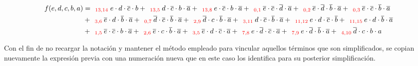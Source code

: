 \begin{equation*}
\begin{align*}
f(e,d,c,b,a) & = _{\ \ \color{red} 13,14} {e \cdot d \cdot \overline{c} \cdot b} 
+ _{\ \ \color{red} 13,5}  {d \cdot \overline{c} \cdot b \cdot \overline{a}}
+ _{\ \ \color{red} 13,8}  {e \cdot \overline{c} \cdot b \cdot \overline{a}}
+ _{\ \ \color{red} 0,1}  {\overline{e} \cdot \overline{c} \cdot \overline{d} \cdot \overline{a}}
+ _{\ \ \color{red} 0,2}  {\overline{e} \cdot \overline{d} \cdot \overline{b} \cdot \overline{a}}
+ _{\ \ \color{red} 0,3}  {\overline{e} \cdot \overline{c} \cdot \overline{b} \cdot \overline{a}} \\
& + _{\ \ \color{red} 3,6}  {\overline{e} \cdot d \cdot \overline{b} \cdot \overline{a}} 
+ _{\ \ \color{red} 0,7}  {\overline{d} \cdot \overline{c} \cdot \overline{b} \cdot \overline{a}}
+ _{\ \ \color{red} 2,9}  {\overline{d} \cdot c \cdot \overline{b} \cdot \overline{a}}
+ _{\ \ \color{red} 3,11}  {d \cdot \overline{c} \cdot \overline{b} \cdot \overline{a}} 
+ _{\ \ \color{red} 11,12}  {e \cdot d \cdot \overline{c} \cdot \overline{b}}
+ _{\ \ \color{red} 11,15}  {e \cdot d \cdot \overline{b} \cdot \overline{a}} \\
& + _{\ \ \color{red} 1,5}  {\overline{e} \cdot \overline{c} \cdot b \cdot \overline{a}}
+ _{\ \ \color{red} 2,6}  {\overline{e} \cdot c \cdot \overline{b} \cdot \overline{a}} 
+ _{\ \ \color{red} 3,5}  {\overline{e} \cdot d \cdot \overline{c} \cdot \overline{a}}
+ _{\ \ \color{red} 7,8}  {e \cdot \overline{d} \cdot \overline{c} \cdot \overline{a}} 
+ _{\ \ \color{red} 7,9}  {e \cdot \overline{d} \cdot \overline{b} \cdot \overline{a}}
+ _{\ \ \color{red} 4,10}  {\overline{d} \cdot c \cdot b \cdot a}
\end{align*}
\end{equation*}

Con el fin de no recargar la notaci\'on y mantener el m\'etodo empleado para vincular aquellos
t\'erminos que son simplificados, se copian nuevamente la expresi\'on previa con una numeraci\'on nueva
que en este caso los identifica para su posterior simplificaci\'on.

